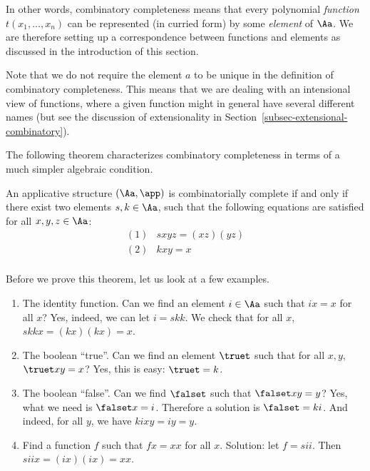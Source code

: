 \documentclass[12pt]{article}
\begin{document}
In other words, combinatory completeness means that every polynomial
{\em function} $t(x_1,\ldots,x_n)$ can be represented (in curried
form) by some {\em element} of $\Aa$. We are therefore setting up a
correspondence between functions and elements as discussed in the
introduction of this section.

Note that we do not require the element $a$ to be unique in the
definition of combinatory completeness. This means that we are dealing
with an intensional view of functions, where a given function might in
general have several different names (but see the discussion of
extensionality in Section~\ref{subsec-extensional-combinatory}).

The following theorem characterizes combinatory completeness in terms
of a much simpler algebraic condition.

\begin{theorem}\label{thm-combinatory-completeness}
  An applicative structure $(\Aa,\app)$ is combinatorially complete if
  and only if there exist two elements $s,k\in \Aa$, such that the
  following equations are satisfied for all $x,y,z\in\Aa$:
  \[ \begin{array}{ll}
    (1) & sxyz = (xz)(yz) \\
    (2) & kxy = x \\
  \end{array}
  \]
\end{theorem}

\begin{example}\label{exa-combinatory-completeness}
  Before we prove this theorem, let us look at a few examples.
  \begin{enumerate}\alphalabels
  \item The identity function. Can we find an element $i\in\Aa$ such
    that $ix=x$ for all $x$? Yes, indeed, we can let $i=skk$. We check
    that for all $x$, $skkx = (kx)(kx) = x$.
  \item The boolean ``true''. Can we find an element $\truet$ such
    that for all $x,y$, $\truet xy = x$? Yes, this is easy: $\truet = k$.
  \item The boolean ``false''. Can we find $\falset$ such that
    $\falset xy = y$?  Yes, what we need is $\falset x = i$. Therefore
    a solution is $\falset = ki$.  And indeed, for all $y$, we have
    $kixy = iy = y$.
  \item Find a function $f$ such that $fx = xx$ for all $x$. Solution:
    let $f=sii$. Then $siix = (ix)(ix) = xx$. 
  \end{enumerate}
\end{example}
\end{document}
